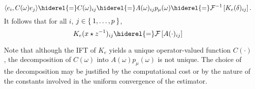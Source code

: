 \begin{dmath}
\label{eq:operator_identification_real}\inner{e_i,C(\omega)e_j}\hiderel{=}C(\omega)_{ij}\hiderel{=}A(\omega)_{ij}p_{\mu}(\omega)\hiderel{=}\IFT{K_e(\delta)_{ij}}.
\end{dmath}
It follows that for all $i$, $j \in \Set{1, \ldots, p}$,
\begin{dmath}\label{eq:matrix-exp}
K_e(x\groupop \inv{z})_{ij} \hiderel{=} \FT{A(\cdot)_{ij}}
\end{dmath}

\begin{remark}
Note that although the \acl{IFT} of $K_e$ yields a unique operator-valued function $C(\cdot)$, the decomposition of $C(\omega)$ into $A(\omega)p_\mu(\omega)$ is not unique. The choice of the decomposition may be justified by the computational cost or by the nature of the constants involved in the uniform convergence of the estimator.
\end{remark}

